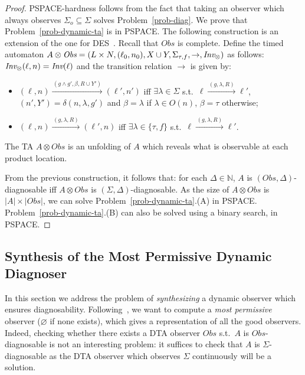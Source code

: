 \documentclass[letterpaper,10pt,conference]{ieeeconf}  \IEEEoverridecommandlockouts                              \overrideIEEEmargins
\def\st{{s.t.}~}
\newcommand{\setN}{\mathbb N}
\def\tauac{\tau}
\def\obs{\textit{Obs}\xspace}
\begin{document}
\begin{proof}
  PSPACE-hardness follows from the fact that taking an observer which
  always observes $\Sigma_o \subseteq \Sigma$ solves
  Problem~\ref{prob-diag}.  We prove that
  Problem~\ref{prob-dynamic-ta} is in PSPACE.  The following
  construction is an extension of the one for DES~\cite{cassez-fi-08}.
  Recall that $\obs$ is complete.  Define the timed automaton $A
  \otimes \obs=(L \times N,(\ell_0,n_0),X \cup
  Y,\Sigma_{\tauac,f},\rightarrow,\inv_\otimes)$ as follows:
  $\textit{Inv}_\otimes(\ell,n)=\textit{Inv}(\ell)$ and the transition relation
  $\rightarrow$ is given by:
\begin{itemize}
\item $(\ell,n) \xrightarrow{\,(g \wedge g',\beta,R \cup Y')\,}
  (\ell',n')$ iff $\exists \lambda \in \Sigma$ \st $\ell
  \xrightarrow{\,(g,\lambda,R)\,} \ell'$,
  $(n',Y')=\delta(n,\lambda,g')$ and $\beta=\lambda$ if $\lambda \in
  O(n)$, $\beta=\tauac$ otherwise;
\item $(\ell,n) \xrightarrow{\,(g,\lambda,R)\,} (\ell',n)$ iff 
  $\exists \lambda \in \{\tauac,f\}$ \st $\ell
  \xrightarrow{\,(g,\lambda,R)\,} \ell'$.
\end{itemize}
The TA $A \otimes \obs$ is an unfolding of $A$ which reveals what is
observable at each product location.

From the previous construction, it follows that: for each $\Delta \in
\setN$, $A$ is $(\obs,\Delta)$-diagnosable iff $A \otimes \obs$ is
$(\Sigma,\Delta)$-diagnosable.  As the size of $A \otimes \obs$ is
$|A| \times |\obs|$, we can solve Problem~\ref{prob-dynamic-ta}.(A) in
PSPACE.  Problem~\ref{prob-dynamic-ta}.(B) can also be solved using a
binary search, in PSPACE.
\end{proof}

\subsection{Synthesis of the Most Permissive Dynamic Diagnoser}
In this section we address the problem of \emph{synthesizing} a \dta
dynamic observer which ensures
diagnosability. Following~\cite{cassez-fi-08}, we want to compute a
\emph{most permissive} observer ($\varnothing$ if none exists), which
gives a representation of all the good observers.  Indeed, checking
whether there exists a DTA observer $\obs$ \st $A$ is
$\obs$-diagnosable is not an interesting problem: it suffices to check
that $A$ is $\Sigma$-diagnosable as the DTA observer which observes
$\Sigma$ continuously will be a solution.
\end{document}
